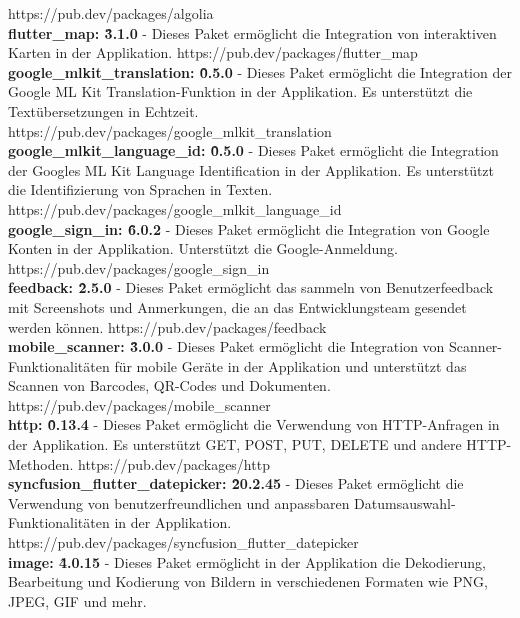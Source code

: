https://pub.dev/packages/algolia
\\
\textbf{flutter\_map: \^3.1.0}\cite{package_flutter_map} - Dieses Paket ermöglicht die Integration von interaktiven Karten in der Applikation.
https://pub.dev/packages/flutter\_map
\\
\textbf{google\_mlkit\_translation: \^0.5.0}\cite{package_google_mlkit_translation} - Dieses Paket ermöglicht die Integration der Google ML Kit Translation-Funktion in der Applikation. Es unterstützt die Textübersetzungen in Echtzeit.
https://pub.dev/packages/google\_mlkit\_translation
\\
\textbf{google\_mlkit\_language\_id: \^0.5.0}\cite{package_google_mlkit_language_id} - Dieses Paket ermöglicht die Integration der Googles ML Kit Language Identification in der Applikation. Es unterstützt die Identifizierung von Sprachen in Texten.
https://pub.dev/packages/google\_mlkit\_language\_id
\\
\textbf{google\_sign\_in: \^6.0.2}\cite{package_google_sign_in} - Dieses Paket ermöglicht die Integration von Google Konten in der Applikation. Unterstützt die Google-Anmeldung.
https://pub.dev/packages/google\_sign\_in
\\
\textbf{feedback: \^2.5.0}\cite{package_feedback} - Dieses Paket ermöglicht das sammeln von Benutzerfeedback mit Screenshots und Anmerkungen, die an das Entwicklungsteam gesendet werden können.
https://pub.dev/packages/feedback
\\
\textbf{mobile\_scanner: \^3.0.0}\cite{package_mobile_scanner} - Dieses Paket ermöglicht die Integration von Scanner-Funktionalitäten für mobile Geräte in der Applikation und unterstützt das Scannen von Barcodes, QR-Codes und Dokumenten.
https://pub.dev/packages/mobile\_scanner
\\
\textbf{http: \^0.13.4}\cite{package_http} - Dieses Paket ermöglicht die Verwendung von HTTP-Anfragen in der Applikation. Es unterstützt GET, POST, PUT, DELETE und andere HTTP-Methoden.
https://pub.dev/packages/http
\\
\textbf{syncfusion\_flutter\_datepicker: \^20.2.45}\cite{package_syncfusion_flutter_datepicker} - Dieses Paket ermöglicht die Verwendung von benutzerfreundlichen und anpassbaren Datumsauswahl-Funktionalitäten in der Applikation.
https://pub.dev/packages/syncfusion\_flutter\_datepicker
\\
\textbf{image: \^4.0.15}\cite{package_image} - Dieses Paket ermöglicht in der Applikation die Dekodierung, Bearbeitung und Kodierung von Bildern in verschiedenen Formaten wie PNG, JPEG, GIF und mehr.
